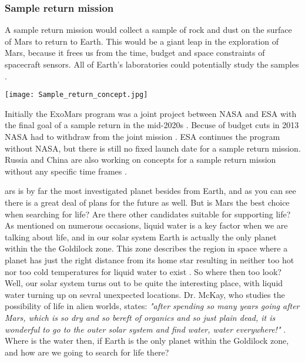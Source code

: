 \begin{multicols}{2}
\subsubsection{Sample return mission}

A sample return mission would collect a sample of rock and dust on the surface of Mars to return to Earth.
This would be a giant leap in the exploration of Mars, because it frees us from the time, budget and space constraints of spacecraft sensors.
All of Earth's laboratories could potentially study the samples \cite{EarthAnalysis}.
 
\begin{center}
	\texttt{[image: Sample\_return\_concept.jpg]}
\end{center}

Initially the ExoMars program was a joint project between NASA and ESA with the final goal of a sample return in the mid-2020s \cite{FPlan15}.
Becuse of budget cuts in 2013 NASA had to withdraw from the joint mission \cite{FPlan16}.
ESA continues the program without NASA, but there is still no fixed launch date for a sample return mission.
Russia and China are also working on concepts for a sample return mission without any specific time frames \cite{RussiaPlan} \cite{ChinaPlan}.

ars is by far the most investigated planet besides from Earth, and as you can see there is a great deal of plans for the future as well.
But is Mars the best choice when searching for life?
Are there other candidates suitable for supporting life? 
As mentioned on numerous occasions, liquid water is a key factor when we are talking about life, and in our solar system Earth is actually the only planet within the the Goldilock zone.
This zone describes the region in space where a planet has just the right distance from its home star resulting in neither too hot nor too cold temperatures for liquid water to exist \cite{FPlan26}.
So where then too look?
Well, our solar system turns out to be quite the interesting place, with liquid water turning up on sevral unexpected locations. 
Dr. McKay, who studies the possibility of life in alien worlds, states: \emph{"after spending so many years going after Mars, which is so dry and so bereft of organics and so just plain dead, it is wonderful to go to the outer solar system and find water, water everywhere!"} \cite{FPlan09}.
Where is the water then, if Earth is the only planet within the Goldilock zone, and how are we going to search for life there?


\end{multicols}
